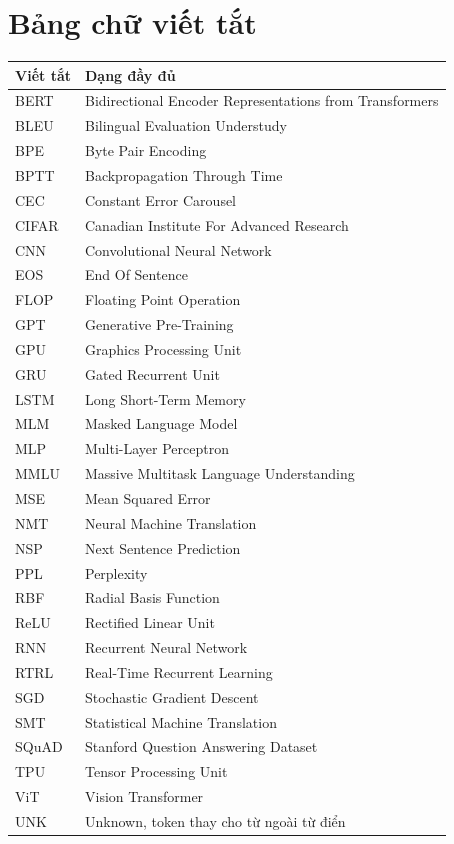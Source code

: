 \chapter{Bảng chữ viết tắt}
\label{app:viet-tat}

\small
\begin{tabular}{@{}ll@{}}
\toprule
Viết tắt & Dạng đầy đủ \\
\midrule
BERT & Bidirectional Encoder Representations from Transformers \\
BLEU & Bilingual Evaluation Understudy \\
BPE  & Byte Pair Encoding \\
BPTT & Backpropagation Through Time \\
CEC  & Constant Error Carousel \\
CIFAR & Canadian Institute For Advanced Research \\
CNN  & Convolutional Neural Network \\
EOS  & End Of Sentence \\
FLOP & Floating Point Operation \\
GPT  & Generative Pre-Training \\
GPU  & Graphics Processing Unit \\
GRU  & Gated Recurrent Unit \\
LSTM & Long Short-Term Memory \\
MLM  & Masked Language Model \\
MLP  & Multi-Layer Perceptron \\
MMLU & Massive Multitask Language Understanding \\
MSE  & Mean Squared Error \\
NMT  & Neural Machine Translation \\
NSP  & Next Sentence Prediction \\
PPL  & Perplexity \\
RBF  & Radial Basis Function \\
ReLU & Rectified Linear Unit \\
RNN  & Recurrent Neural Network \\
RTRL & Real-Time Recurrent Learning \\
SGD  & Stochastic Gradient Descent \\
SMT  & Statistical Machine Translation \\
SQuAD & Stanford Question Answering Dataset \\
TPU  & Tensor Processing Unit \\
ViT  & Vision Transformer \\
UNK  & Unknown, token thay cho từ ngoài từ điển \\
\bottomrule
\end{tabular}
\normalsize

